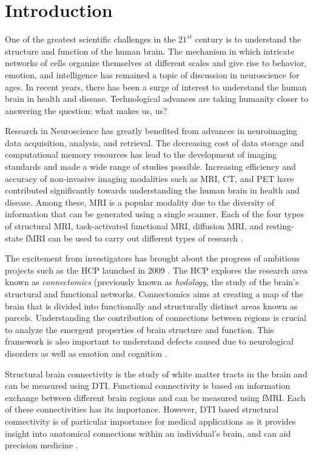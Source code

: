 \documentclass[msthesis.tex]{subfiles}
\begin{document}
\chapter{Introduction}
One of the greatest scientific challenges in the $21^{st}$ century is to understand the structure and function of the human brain. The mechanism in which intricate networks of cells organize themselves at different scales and give rise to behavior, emotion, and intelligence has remained a topic of discussion in neuroscience for ages. In recent years, there has been a surge of interest to understand the human brain in health and disease. Technological advances are taking humanity closer to answering the question: what makes us, us? 

Research in Neuroscience has greatly benefited from advances in neuroimaging data acquisition, analysis, and retrieval. The decreasing cost of data storage and computational memory resources has lead to the development of imaging standards and made a wide range of studies possible. Increasing efficiency and accuracy of non-invasive imaging modalities such as \gls{MRI}, \gls{CT}, and \gls{PET} have contributed significantly towards understanding the human brain in health and disease. Among these, \gls{MRI} is a popular modality due to the diversity of information that can be generated using a single scanner. Each of the four types of structural MRI, task-activated functional \gls{MRI}, diffusion \gls{MRI}, and resting-state \gls{fMRI} can be used to carry out different types of research \citep{van2016human}. 

The excitement from investigators has brought about the progress of ambitious projects such as the \gls{HCP} launched in 2009 \citep{van2016human}. The \gls{HCP} explores the research area known as \textit{connectomics} (previously known as \textit{hodology}, the study of the brain's structural and functional networks. Connectomics aims at creating a map of the brain that is divided into functionally and structurally distinct areas known as parcels. Understanding the contribution of connections between regions is crucial to analyze the emergent properties of brain structure and function. This framework is also important to understand defects caused due to neurological disorders as well as emotion and cognition \citep{sala2015reorganization}. 

Structural brain connectivity is the study of white matter tracts in the brain and can be measured using \gls{DTI}. Functional connectivity is based on information exchange between different brain regions and can be measured using \gls{fMRI}. Each of these connectivities has its importance. However, \gls{DTI} based structural connectivity is of particular importance for medical applications as it provides insight into anatomical connections within an individual's brain, and can aid precision medicine \citep{cociu2017multimodal}.
\end{document}
